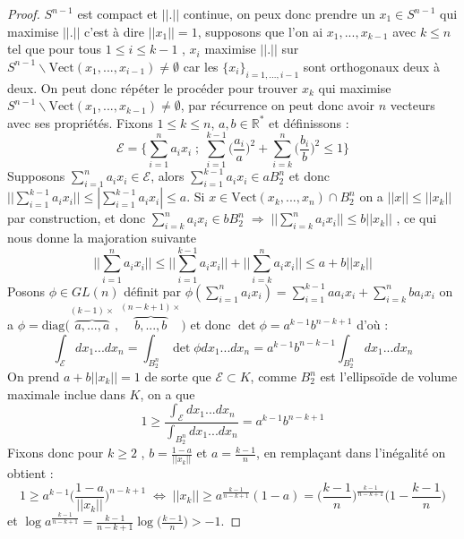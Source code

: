 \documentclass[12pt]{article}
\theoremstyle{definition}
\begin{document}
\begin{proof}
	$S^{n-1}$ est compact et $||.||$ continue, on peux donc prendre un $x_1\in S^{n-1}$ qui maximise $||.||$ c'est à dire $||x_1||=1$, supposons que l'on ai $x_1,...,x_{k-1}$ avec $k\leq n$ tel que pour tous $1\leq i\leq k-1$ , $x_i$ maximise $||.||$ sur $S^{n-1}\backslash \text{Vect}(x_1,...,x_{i-1})\neq \emptyset$ car les $\{x_i\}_{i=1,...,i-1}$ sont orthogonaux deux à deux. On peut donc répéter le procéder pour trouver $x_{k}$ qui maximise $S^{n-1}\backslash \text{Vect}(x_1,...,x_{k-1})\neq \emptyset$, par récurrence on peut donc avoir $n$ vecteurs avec ses propriétés. Fixons $1\leq k \leq n$, $a,b\in\mathbb{R}^{*}$ et définissons :
	\begin{equation*}
	\mathcal{E} = \Big\{\sum_{i=1}^{n}a_ix_i\; ; \; \sum_{i=1}^{k-1}\big(\frac{a_i}{a}\big)^2+ \sum_{i=k}^{n}\big(\frac{b_i}{b}\big)^2\leq 1 \Big\}
	\end{equation*}
	Supposons $\sum_{i=1}^{n}a_ix_i\in \mathcal{E}$, alors $\sum_{i=1}^{k-1}a_ix_i\in aB_2^n$ et donc $||\sum_{i=1}^{k-1}a_ix_i||\leq|\sum_{i=1}^{k-1}a_ix_i|\leq a$.
	Si $x\in \text{Vect}(x_k,...,x_n)\cap B^n_2$ on a $||x||\leq ||x_k||$ par construction, et donc $\sum_{i=k}^{n}a_ix_i\in bB_2^n \; \Rightarrow \; ||\sum_{i=k}^{n}a_ix_i ||\leq b||x_k||$ , ce qui nous donne la majoration suivante 
	\begin{equation*}
	||\sum_{i=1}^{n}a_ix_i||\leq ||\sum_{i=1}^{k-1}a_ix_i||+||\sum_{i=k}^{n}a_ix_i||\leq a + b||x_k||
	\end{equation*}
	Posons $\phi\in GL(n)$ définit par $\phi(\sum_{i=1}^{n}a_ix_i)=\sum_{i=1}^{k-1}aa_ix_i+\sum_{i=k}^{n}ba_ix_i$ on a $\phi = \text{diag}\big(\overbrace{a,...,a}^{(k-1)\times},\overbrace{b,...,b}^{(n-k+1) \times}\big)$ et donc $\det \phi = a^{k-1}b^{n-k+1}$ d'où :
	\begin{equation*}
	\int_{\mathcal{E}} dx_1...dx_n = \int_{B_2^n} \det \phi dx_1...dx_n= a^{k-1}b^{n-k-1}\int_{B_2^n}dx_1...dx_n
	\end{equation*}
	On prend $a+b||x_k||= 1$ de sorte que $\mathcal{E}\subset K$, comme $B_2^n$ est l'ellipsoïde de volume maximale inclue dans $K$, on a que  
	\begin{equation*}
	1\geq\frac{\int_{\mathcal{E}} dx_1...dx_n}{\int_{B_2^n}dx_1...dx_n}=a^{k-1}b^{n-k+1}
	\end{equation*}
	Fixons donc pour $k\geq 2$ , $b=\frac{1-a}{||x_k||}$ et $a=\frac{k-1}{n}$, en remplaçant dans l'inégalité on obtient :
	\begin{equation*}
	1\geq a^{k-1} \Big(\frac{1-a}{||x_k||}\Big)^{n-k+1} \; \iff \; ||x_k||\geq a^{\frac{k-1}{n-k+1}}(1-a) = \Big(\frac{k-1}{n}\Big)^{\frac{k-1}{n-k+1}}\Big(1-\frac{k-1}{n}\Big)
	\end{equation*}
	et $\log a^{\frac{k-1}{n-k+1}}= \frac{k-1}{n-k+1}\log\Big(\frac{k-1}{n}\Big)>-1$.
	
\end{proof}
\end{document}
